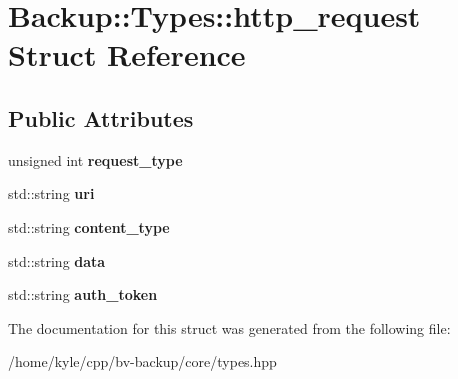 \hypertarget{struct_backup_1_1_types_1_1http__request}{}\section{Backup\+:\+:Types\+:\+:http\+\_\+request Struct Reference}
\label{struct_backup_1_1_types_1_1http__request}
\subsection*{Public Attributes}
\begin{DoxyCompactItemize}
\item 
\mbox{\label{struct_backup_1_1_types_1_1http__request_ab67dede4a309e2db9f9aa671235a241d}} 
unsigned int {\bfseries request\+\_\+type}
\item 
\mbox{\label{struct_backup_1_1_types_1_1http__request_a362e7fd66365d5f34ac63a50fcf65622}} 
std\+::string {\bfseries uri}
\item 
\mbox{\label{struct_backup_1_1_types_1_1http__request_a10ef0dae4190242fd60fc45d59ccc167}} 
std\+::string {\bfseries content\+\_\+type}
\item 
\mbox{\label{struct_backup_1_1_types_1_1http__request_a5ec6dfcfbbd5e9051d2a31e2576a0bce}} 
std\+::string {\bfseries data}
\item 
\mbox{\label{struct_backup_1_1_types_1_1http__request_adff2e1766ef739fb3ad01d6fdaeb1585}} 
std\+::string {\bfseries auth\+\_\+token}
\end{DoxyCompactItemize}


The documentation for this struct was generated from the following file\+:\begin{DoxyCompactItemize}
\item 
/home/kyle/cpp/bv-\/backup/core/types.\+hpp\end{DoxyCompactItemize}
